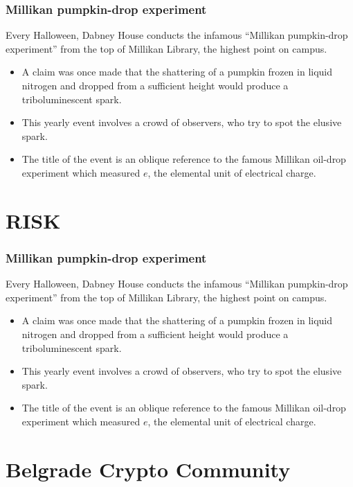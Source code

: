 \documentclass[hyperref={bookmarks=false},aspectratio=169]{beamer}
\begin{document}
\begin{frame}
\frametitle{Millikan pumpkin-drop experiment}
Every Halloween, Dabney House conducts the infamous ``Millikan pumpkin-drop experiment'' from the top of Millikan Library, the highest point on campus.

\begin{itemize}
    \item A claim was once made that the shattering of a pumpkin frozen in liquid nitrogen and dropped from a sufficient height would produce a triboluminescent spark. 
    \item This yearly event involves a crowd of observers, who try to spot the elusive spark.
    \item The title of the event is an oblique reference to the famous Millikan oil-drop experiment which measured $e$, the elemental unit of electrical charge.
\end{itemize}

\end{frame}

\section{RISK}

\begin{frame}
\frametitle{Millikan pumpkin-drop experiment}
Every Halloween, Dabney House conducts the infamous ``Millikan pumpkin-drop experiment'' from the top of Millikan Library, the highest point on campus.

\begin{itemize}
    \item A claim was once made that the shattering of a pumpkin frozen in liquid nitrogen and dropped from a sufficient height would produce a triboluminescent spark. 
    \item This yearly event involves a crowd of observers, who try to spot the elusive spark.
    \item The title of the event is an oblique reference to the famous Millikan oil-drop experiment which measured $e$, the elemental unit of electrical charge.
\end{itemize}

\end{frame}


\section{Belgrade Crypto Community}
\end{document}
